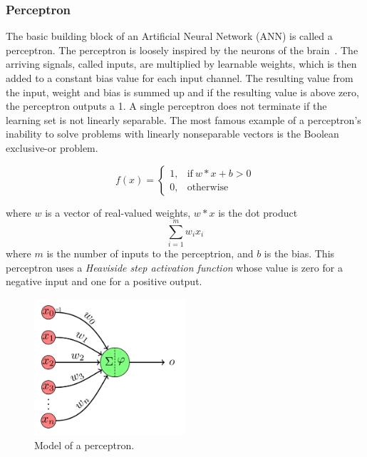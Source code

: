 \documentclass[english, bibtex]{kththesis}
\begin{document}
\subsubsection{Perceptron}
The basic building block of an Artificial Neural Network (ANN) is called a perceptron. The perceptron is loosely inspired by the neurons of the brain~\cite{rosenblatt1958perceptron}. The arriving signals, called inputs, are multiplied by learnable weights, which is then added to a constant bias value for each input channel. The resulting value from the input, weight and bias is summed up and if the resulting value is above zero, the perceptron outputs a 1. A single perceptron does not terminate if the learning set is not linearly separable. The most famous example of a perceptron's inability to solve problems with linearly nonseparable vectors is the Boolean exclusive-or problem.

\begin{equation}
    f(x) = 
        \begin{cases}
          1, & \text{if}\ w * x + b > 0 \\
          0, & \text{otherwise}
        \end{cases}
    \label{eqn:perceptron}
\end{equation}

where $w$ is a vector of real-valued weights, $w * x$ is the dot product \[\sum_{i=1}^{m} w_i x_i\] where $m$ is the number of inputs to the perceptrion, and $b$ is the bias. This perceptron uses a \textit{Heaviside step activation function} whose value is zero for a negative input and one for a positive output.

\begin{figure}[H]
  \begin{center}
    \includegraphics[width=0.5\textwidth]{figures/perceptron.png}
  \end{center}
  \caption{Model of a perceptron.}
  \label{fig:perceptron}
\end{figure}
\end{document}
